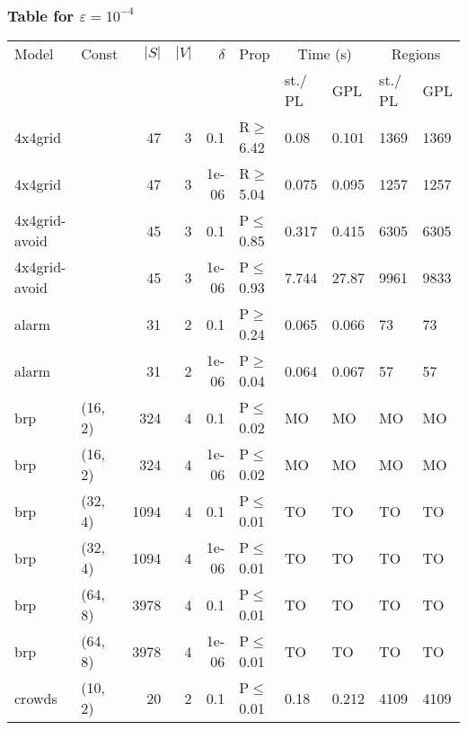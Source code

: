 \subsubsection{Table for \(\varepsilon=10^{-4}\)}
\begin{longtable}{llrrrlllll}

        \toprule
        Model & Const & $|S|$ & $|V|$ & $\delta$ & Prop & \multicolumn{2}{c}{Time (s)} & \multicolumn{2}{c}{Regions} \\
        \cmidrule(ll){7-8} \cmidrule(ll){9-10}
        & & & & & & st./ PL & GPL & st./ PL & GPL \\
        \midrule
        
 4x4grid       &           &     	47 &   3 & 0.1   & R$\geq$6.42  & 0.08    & 0.101    & 1369   & 1369    \\
 4x4grid       &           &     	47 &   3 & 1e-06 & R$\geq$5.04  & 0.075   & 0.095    & 1257   & 1257    \\
 4x4grid-avoid &           &     	45 &   3 & 0.1   & P$\leq$0.85  & 0.317   & 0.415    & 6305   & 6305    \\
 4x4grid-avoid &           &     	45 &   3 & 1e-06 & P$\leq$0.93  & 7.744   & 27.87    & 9961   & 9833    \\
 alarm         &           &     	31 &   2 & 0.1   & P$\geq$0.24  & 0.065   & 0.066    & 73     & 73      \\
 alarm         &           &     	31 &   2 & 1e-06 & P$\geq$0.04  & 0.064   & 0.067    & 57     & 57      \\
 brp           & (16, 2)   &    	324 &   4 & 0.1   & P$\leq$0.02  & MO      & MO       & MO     & MO      \\
 brp           & (16, 2)   &    	324 &   4 & 1e-06 & P$\leq$0.02  & MO      & MO       & MO     & MO      \\
 brp           & (32, 4)   &   	1094 &   4 & 0.1   & P$\leq$0.01  & TO      & TO       & TO     & TO      \\
 brp           & (32, 4)   &   	1094 &   4 & 1e-06 & P$\leq$0.01  & TO      & TO       & TO     & TO      \\
 brp           & (64, 8)   &   	3978 &   4 & 0.1   & P$\leq$0.01  & TO      & TO       & TO     & TO      \\
 brp           & (64, 8)   &   	3978 &   4 & 1e-06 & P$\leq$0.01  & TO      & TO       & TO     & TO      \\
 crowds        & (10, 2)   &     	20 &   2 & 0.1   & P$\leq$0.01  & 0.18    & 0.212    & 4109   & 4109    \\

\end{longtable}
